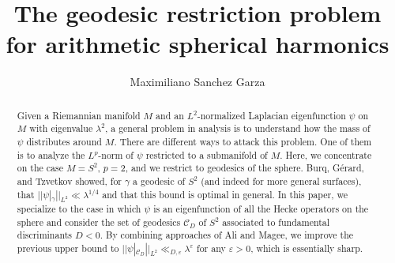 \documentclass[11pt]{amsart}
\theoremstyle{definition}
\theoremstyle{remark}
\begin{document}
\title{The geodesic restriction problem for arithmetic spherical harmonics}
\author{Maximiliano Sanchez Garza}
\date{}

\begin{abstract}
Given a Riemannian manifold $M$ and an $L^2$-normalized Laplacian eigenfunction $\psi$ on $M$ with eigenvalue $\lambda^2$, a general problem in analysis is to understand how the mass of $\psi$ distributes around $M$. There are different ways to attack this problem. One of them is to analyze the $L^p$-norm of $\psi$ restricted to a submanifold of $M$. Here, we concentrate on the case $M=S^2$, $p=2$, and we restrict to geodesics of the sphere. Burq, G\'erard, and Tzvetkov showed, for $\gamma$ a geodesic of $S^2$ (and indeed for more general surfaces), that $||\psi|_{\gamma}||_{L^2} \ll \lambda^{1/4}$ and that this bound is optimal in general. In this paper, we specialize to the case in which $\psi$ is an eigenfunction of all the Hecke operators on the sphere and consider the set of geodesics $\mathcal{C}_{D}$ of $S^2$ associated to fundamental discriminants $D<0$. By combining approaches of Ali and Magee, we improve the previous upper bound to $||\psi|_{\mathcal{C}_{D}}||_{L^2} \ll_{D,\varepsilon} \lambda^{\varepsilon}$ for any $\varepsilon>0$, which is essentially sharp.
\end{abstract}

\maketitle









\end{document}
